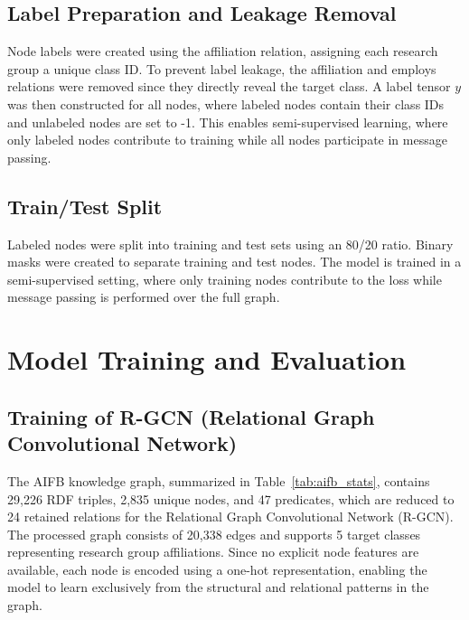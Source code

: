 \documentclass[runningheads]{llncs}
\begin{document}
\subsection{Label Preparation and Leakage Removal}

Node labels were created using the affiliation relation, assigning each research group a unique class ID. To prevent label leakage, the affiliation and employs relations were removed since they directly reveal the target class. A label tensor $y$ was then constructed for all nodes, where labeled nodes contain their class IDs and unlabeled nodes are set to -1. This enables semi-supervised learning, where only labeled nodes contribute to training while all nodes participate in message passing.
\subsection{Train/Test Split}

Labeled nodes were split into training and test sets using an 80/20 ratio. Binary masks were created to separate training and test nodes. The model is trained in a semi-supervised setting, where only training nodes contribute to the loss while message passing is performed over the full graph.
\section{Model Training and Evaluation}

\subsection{Training of R-GCN (Relational Graph Convolutional Network)}
The AIFB knowledge graph, summarized in Table~\ref{tab:aifb_stats}, contains 29,226 RDF triples, 2,835 unique nodes, and 47 predicates, which are reduced to 24 retained relations for the Relational Graph Convolutional Network (R-GCN). The processed graph consists of 20,338 edges and supports 5 target classes representing research group affiliations. Since no explicit node features are available, each node is encoded using a one-hot representation, enabling the model to learn exclusively from the structural and relational patterns in the graph.
\end{document}
